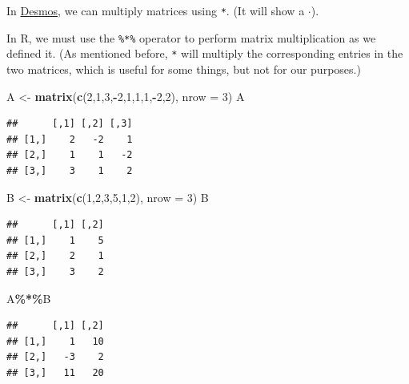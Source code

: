 \documentclass[
]{book}
\newenvironment{Shaded}{\begin{snugshade}}{\end{snugshade}}
\newcommand{\AttributeTok}[1]{\textcolor[rgb]{0.13,0.29,0.53}{#1}}
\newcommand{\DecValTok}[1]{\textcolor[rgb]{0.00,0.00,0.81}{#1}}
\newcommand{\FunctionTok}[1]{\textcolor[rgb]{0.13,0.29,0.53}{\textbf{#1}}}
\newcommand{\NormalTok}[1]{#1}
\newcommand{\OtherTok}[1]{\textcolor[rgb]{0.56,0.35,0.01}{#1}}
\newcommand{\SpecialCharTok}[1]{\textcolor[rgb]{0.81,0.36,0.00}{\textbf{#1}}}
\theoremstyle{definition}
\theoremstyle{definition}
\theoremstyle{definition}
\theoremstyle{definition}
\theoremstyle{remark}
\begin{document}
In \href{https://www.desmos.com/matrix}{Desmos}, we can multiply matrices using \texttt{*}. (It will show a \(\cdot\)).

In R, we must use the \texttt{\%*\%} operator to perform matrix multiplication as we defined it. (As mentioned before, \texttt{*} will multiply the corresponding entries in the two matrices, which is useful for some things, but not for our purposes.)

\begin{Shaded}
\begin{Highlighting}[]
\NormalTok{A }\OtherTok{\textless{}{-}} \FunctionTok{matrix}\NormalTok{(}\FunctionTok{c}\NormalTok{(}\DecValTok{2}\NormalTok{,}\DecValTok{1}\NormalTok{,}\DecValTok{3}\NormalTok{,}\SpecialCharTok{{-}}\DecValTok{2}\NormalTok{,}\DecValTok{1}\NormalTok{,}\DecValTok{1}\NormalTok{,}\DecValTok{1}\NormalTok{,}\SpecialCharTok{{-}}\DecValTok{2}\NormalTok{,}\DecValTok{2}\NormalTok{), }\AttributeTok{nrow =} \DecValTok{3}\NormalTok{)}
\NormalTok{A}
\end{Highlighting}
\end{Shaded}

\begin{verbatim}
##      [,1] [,2] [,3]
## [1,]    2   -2    1
## [2,]    1    1   -2
## [3,]    3    1    2
\end{verbatim}

\begin{Shaded}
\begin{Highlighting}[]
\NormalTok{B }\OtherTok{\textless{}{-}} \FunctionTok{matrix}\NormalTok{(}\FunctionTok{c}\NormalTok{(}\DecValTok{1}\NormalTok{,}\DecValTok{2}\NormalTok{,}\DecValTok{3}\NormalTok{,}\DecValTok{5}\NormalTok{,}\DecValTok{1}\NormalTok{,}\DecValTok{2}\NormalTok{), }\AttributeTok{nrow =} \DecValTok{3}\NormalTok{)}
\NormalTok{B}
\end{Highlighting}
\end{Shaded}

\begin{verbatim}
##      [,1] [,2]
## [1,]    1    5
## [2,]    2    1
## [3,]    3    2
\end{verbatim}

\begin{Shaded}
\begin{Highlighting}[]
\NormalTok{A}\SpecialCharTok{\%*\%}\NormalTok{B}
\end{Highlighting}
\end{Shaded}

\begin{verbatim}
##      [,1] [,2]
## [1,]    1   10
## [2,]   -3    2
## [3,]   11   20
\end{verbatim}
\end{document}
